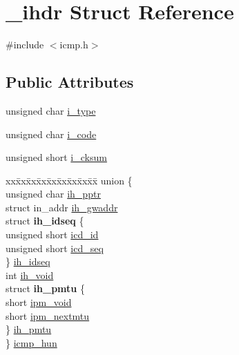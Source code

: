 \hypertarget{struct__ihdr}{\section{\-\_\-ihdr \-Struct \-Reference}
\label{struct__ihdr}
}


{\ttfamily \#include $<$icmp.\-h$>$}

\subsection*{\-Public \-Attributes}
\begin{DoxyCompactItemize}
\item 
unsigned char \hyperlink{struct__ihdr_a397fe195616b23c60093545fc8595112}{i\-\_\-type}
\item 
unsigned char \hyperlink{struct__ihdr_abfe0b610d94a9d3abf86618edc169edf}{i\-\_\-code}
\item 
unsigned short \hyperlink{struct__ihdr_a57fae7fcc12a40ad4e9b745433523448}{i\-\_\-cksum}
\item 
\begin{tabbing}
xx\=xx\=xx\=xx\=xx\=xx\=xx\=xx\=xx\=\kill
union \{\\
\>unsigned char \hyperlink{struct__ihdr_a23a9d84c4095df74a9a9c0788db519c1}{ih\_pptr}\\
\>struct in\_addr \hyperlink{struct__ihdr_af439f98bdf25360055160d2b6e6157c5}{ih\_gwaddr}\\
\>struct {\bfseries ih\_idseq} \{\\
\>\>unsigned short \hyperlink{struct__ihdr_a55f8e45d5702dce3c541858b0c5050ab}{icd\_id}\\
\>\>unsigned short \hyperlink{struct__ihdr_ae9eb480801731dd6c2d0e512cb3ff6bf}{icd\_seq}\\
\>\} \hyperlink{struct__ihdr_ac70ebc2c5e455cd6574dc9a7d593e360}{ih\_idseq}\\
\>int \hyperlink{struct__ihdr_a152872ebf0c8d333999a52c670d6d6c8}{ih\_void}\\
\>struct {\bfseries ih\_pmtu} \{\\
\>\>short \hyperlink{struct__ihdr_a59e303100965e4ba3abcfbb90f545777}{ipm\_void}\\
\>\>short \hyperlink{struct__ihdr_add4f758969a104d48e295cfb9c07c243}{ipm\_nextmtu}\\
\>\} \hyperlink{struct__ihdr_ad3df54682f98c24d5cf737d5bdc05633}{ih\_pmtu}\\
\} \hyperlink{struct__ihdr_abe0a2d0debc1ff2897f3202ef04b9766}{icmp\_hun}\\


\end{tabbing}
\end{DoxyCompactItemize}

